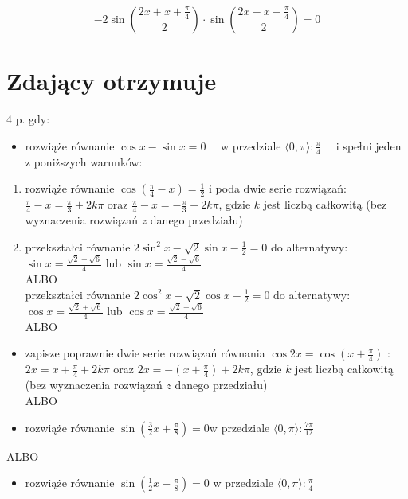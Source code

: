 \documentclass[10pt]{article}
\begin{document}
$$
-2 \sin \left(\frac{2 x+x+\frac{\pi}{4}}{2}\right) \cdot \sin \left(\frac{2 x-x-\frac{\pi}{4}}{2}\right)=0
$$

\section*{Zdający otrzymuje}
 4 p. gdy:\begin{itemize}
  \item rozwiąże równanie $\cos x-\sin x=0 \quad$ w przedziale $\langle 0, \pi\rangle: \frac{\pi}{4} \quad$ i spełni jeden z poniższych warunków:
\end{itemize}

\begin{enumerate}
  \item rozwiąże równanie $\cos \left(\frac{\pi}{4}-x\right)=\frac{1}{2}$ i poda dwie serie rozwiązań:\\
$\frac{\pi}{4}-x=\frac{\pi}{3}+2 k \pi$ oraz $\frac{\pi}{4}-x=-\frac{\pi}{3}+2 k \pi$, gdzie $k$ jest liczbą całkowitą (bez wyznaczenia rozwiązań $z$ danego przedziału)
  \item przekształci równanie $2 \sin ^{2} x-\sqrt{2} \sin x-\frac{1}{2}=0$ do alternatywy:\\
$\sin x=\frac{\sqrt{2}+\sqrt{6}}{4}$ lub $\sin x=\frac{\sqrt{2}-\sqrt{6}}{4}$\\
ALBO\\
przekształci równanie $2 \cos ^{2} x-\sqrt{2} \cos x-\frac{1}{2}=0$ do alternatywy:\\
$\cos x=\frac{\sqrt{2}+\sqrt{6}}{4}$ lub $\cos x=\frac{\sqrt{2}-\sqrt{6}}{4}$\\
ALBO
\end{enumerate}

\begin{itemize}
  \item zapisze poprawnie dwie serie rozwiązań równania $\cos 2 x=\cos \left(x+\frac{\pi}{4}\right)$ : $2 x=x+\frac{\pi}{4}+2 k \pi$ oraz $2 x=-\left(x+\frac{\pi}{4}\right)+2 k \pi$, gdzie $k$ jest liczbą całkowitą (bez wyznaczenia rozwiązań $z$ danego przedziału)\\
ALBO
  \item rozwiąże równanie $\sin \left(\frac{3}{2} x+\frac{\pi}{8}\right)=0 \mathrm{w}$ przedziale $\langle 0, \pi\rangle: \frac{7 \pi}{12}$
\end{itemize}

ALBO

\begin{itemize}
  \item rozwiąże równanie $\sin \left(\frac{1}{2} x-\frac{\pi}{8}\right)=0$ w przedziale $\langle 0, \pi\rangle: \frac{\pi}{4}$
\end{itemize}
\end{document}
